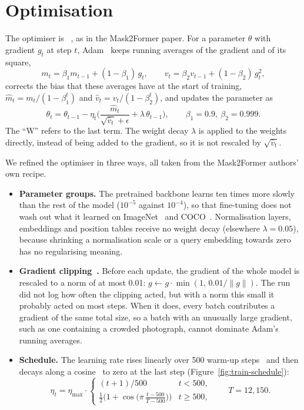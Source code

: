 \section{Optimisation}\label{sec:train-optim}
The optimiser is ~\citep{adamw}, as in the Mask2Former paper. For a parameter $\theta$
with gradient $g_t$ at step $t$, Adam~\citep{kingma2015} keeps running averages of the gradient and of its square,
\begin{equation}
m_t = \beta_1 m_{t-1} + (1-\beta_1)\,g_t, \qquad v_t = \beta_2 v_{t-1} + (1-\beta_2)\,g_t^2,
\end{equation}
corrects the bias that these averages have at the start of training, $\hat m_t = m_t/(1-\beta_1^t)$ and
$\hat v_t = v_t/(1-\beta_2^t)$, and updates the parameter as
\begin{equation}
\theta_t = \theta_{t-1} - \eta_t\Big(\frac{\hat m_t}{\sqrt{\hat v_t}+\epsilon} + \lambda\,\theta_{t-1}\Big),
\qquad \beta_1 = 0.9,\ \beta_2 = 0.999 .
\label{eq:train-adamw}
\end{equation}
The ``W'' refers to the last term. The weight decay $\lambda$ is applied to the weights directly,
instead of being added to the gradient, so it is not rescaled by $\sqrt{\hat v_t}$.

We refined the optimiser in three ways, all taken from the Mask2Former authors' own recipe.
\begin{itemize}[leftmargin=*,itemsep=2pt]
\item \textbf{Parameter groups.} The pretrained backbone learns ten times more slowly than the rest of
the model ($10^{-5}$ against $10^{-4}$), so that fine-tuning does not wash out what it learned on
ImageNet~\citep{deng2009} and COCO~\citep{coco}. Normalisation layers, embeddings and position tables receive no weight decay
(elsewhere $\lambda=0.05$), because shrinking a normalisation scale or a query embedding towards zero
has no regularising meaning.
\item \textbf{Gradient clipping~\citep{pascanu2013}.} Before each update, the gradient of the whole model is rescaled to a
norm of at most 0.01: $g \leftarrow g\cdot\min(1,\,0.01/\lVert g\rVert)$. The run did not log how often
the clipping acted, but with a norm this small it probably acted on most steps. When it does, every
batch contributes a gradient of the same total size, so a batch with an unusually large gradient, such
as one containing a crowded photograph, cannot dominate Adam's running averages.
\item \textbf{Schedule.} The learning rate rises linearly over 500 warm-up steps~\citep{goyal2017} and
then decays along a cosine~\citep{sgdr} to zero at the last step (Figure~\ref{fig:train-schedule}):
\begin{equation}
\eta_t = \eta_{\max}\cdot
\begin{cases}
(t+1)/500 & t < 500,\\[2pt]
\tfrac12\big(1+\cos\big(\pi\,\tfrac{t-500}{T-500}\big)\big) & t \ge 500,
\end{cases}
\qquad T = 12{,}150.
\end{equation}
\end{itemize}

